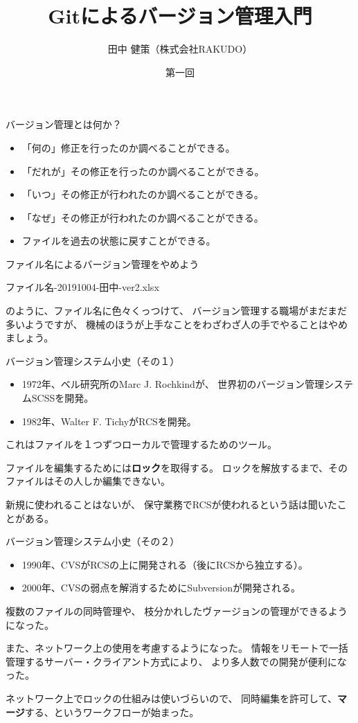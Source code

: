 \documentclass[12pt, unicode]{beamer}
\title{Gitによるバージョン管理入門}
\author{田中 健策（株式会社RAKUDO）}
\date[2020/12/04]{第一回}
\begin{document}
\frame{\maketitle}

\begin{frame}{バージョン管理とは何か？}
\begin{itemize}
\item 「何の」修正を行ったのか調べることができる。
\item 「だれが」その修正を行ったのか調べることができる。
\item 「いつ」その修正が行われたのか調べることができる。
\item 「なぜ」その修正が行われたのか調べることができる。
\item ファイルを過去の状態に戻すことができる。
\end{itemize}
\end{frame}
\begin{frame}{ファイル名によるバージョン管理をやめよう}

ファイル名-20191004-田中-ver2.xlsx

のように、ファイル名に色々くっつけて、
バージョン管理する職場がまだまだ多いようですが、
機械のほうが上手なことをわざわざ人の手でやることはやめましょう。

\end{frame}
\begin{frame}{バージョン管理システム小史（その１）}
\begin{itemize}
\item 1972年、ベル研究所のMarc J. Rochkindが、
世界初のバージョン管理システムSCSSを開発。
\item 1982年、Walter F. TichyがRCSを開発。
\end{itemize}

これはファイルを１つずつローカルで管理するためのツール。

ファイルを編集するためには\textbf{ロック}を取得する。
ロックを解放するまで、そのファイルはその人しか編集できない。

新規に使われることはないが、
保守業務でRCSが使われるという話は聞いたことがある。

\end{frame}
\begin{frame}{バージョン管理システム小史（その２）}
\begin{itemize}
\item 1990年、CVSがRCSの上に開発される（後にRCSから独立する）。
\item 2000年、CVSの弱点を解消するためにSubversionが開発される。
\end{itemize}

複数のファイルの同時管理や、
枝分かれしたヴァージョンの管理ができるようになった。

また、ネットワーク上の使用を考慮するようになった。
情報をリモートで一括管理するサーバー・クライアント方式により、
より多人数での開発が便利になった。

ネットワーク上でロックの仕組みは使いづらいので、
同時編集を許可して、\textbf{マージ}する、というワークフローが始まった。

\end{frame}
\end{document}

